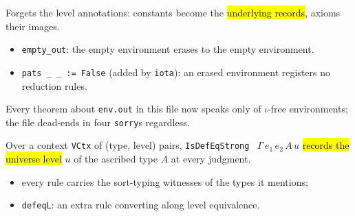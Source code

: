 \begin{definition}
\label{def:expb-venvprime-out}
\leanok
{}

 Forgets the level annotations: constants become the \hl{underlying records}, axioms
their images.
\begin{itemize}
\item \texttt{empty\_out}: the empty environment erases to the empty environment.
\item \texttt{pats \_ \_ := False} (added by \texttt{iota}): an erased environment registers no
reduction rules.
\end{itemize}
 Every theorem about \texttt{env.out} in this file now speaks only of $\iota$-free
environments; the file dead-ends in four \texttt{sorry}s regardless.
\end{definition}

\begin{definition}
\label{inductive:expb-isdefeqstrong-lvl}
\leanok
{}

 Over a context \texttt{VCtx} of (type, level) pairs, \texttt{IsDefEqStrong}~
$\Gamma\,e_1\,e_2\,A\,u$ \hl{records the universe level} $u$ of the ascribed type $A$ at every
judgment.
\begin{itemize}
\item every rule carries the sort-typing witnesses of the types it mentions;
\item \texttt{defeqL}: an extra rule converting along level equivalence.
\end{itemize}
\end{definition}

